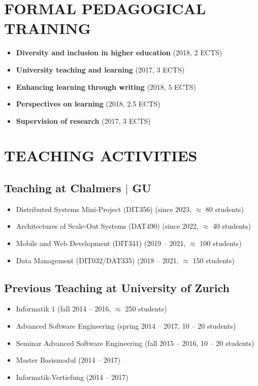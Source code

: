 \documentclass[paper=letter,fontsize=11pt]{scrartcl} %
\newcommand{\NewPart}[2]{\section*{\uppercase{#1} #2}}
\begin{document}
\NewPart{Formal Pedagogical Training}{}

\begin{itemize}
\item \textbf{Diversity and inclusion in higher education} (2018, 2 ECTS)
\item \textbf{University teaching and learning}  (2017, 3 ECTS)
\item \textbf{Enhancing learning through writing} (2018, 5 ECTS)
\item \textbf{Perspectives on learning}  (2018, 2.5 ECTS)
\item \textbf{Supervision of research} (2017, 3 ECTS)

\end{itemize}

\NewPart{Teaching Activities}{}

\subsection*{Teaching at Chalmers $|$ GU}
\begin{itemize}
  \item Distributed Systems Mini-Project (DIT356) (since 2023, $\approx$ 80 students)
  \item Architectures of Scale-Out Systems (DAT490) (since 2022, $\approx$ 40 students)
	\item Mobile and Web Development (DIT341) (2019 -- 2021, $\approx$ 100 students)
  \item Data Management (DIT032/DAT335) (2018 -- 2021, $\approx$ 150 students)
\end{itemize}

\subsection*{Previous Teaching at University of Zurich}
\begin{itemize}
  \item Informatik 1 (fall 2014 -- 2016, $\approx$ 250 students)
  \item Advanced Software Engineering (spring 2014 -- 2017, 10 -- 20 students)
  \item Seminar Advanced Software Engineering (fall 2015 -- 2016, 10 -- 20 students)
  \item Master Basismodul (2014 -- 2017)
  \item Informatik-Vertiefung (2014 -- 2017)
\end{itemize}
\end{document}
